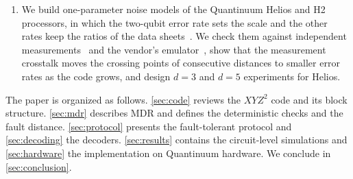 \begin{enumerate}
  \item We build one-parameter noise models of the Quantinuum Helios and H2 processors, in which the two-qubit error rate sets the scale and the other rates keep the ratios of the data sheets~\cite{helios_datasheet,h2_datasheet}. We check them against independent measurements~\cite{ransford2026} and the vendor's emulator~\cite{quantinuum_emulator}, show that the measurement crosstalk moves the crossing points of consecutive distances to smaller error rates as the code grows, and design $d=3$ and $d=5$ experiments for Helios.
\end{enumerate}

The paper is organized as follows. \autoref{sec:code} reviews the $XYZ^2$ code and its block structure. \autoref{sec:mdr} describes MDR and defines the deterministic checks and the fault distance. \autoref{sec:protocol} presents the fault-tolerant protocol and \autoref{sec:decoding} the decoders. \autoref{sec:results} contains the circuit-level simulations and \autoref{sec:hardware} the implementation on Quantinuum hardware. We conclude in \autoref{sec:conclusion}.
